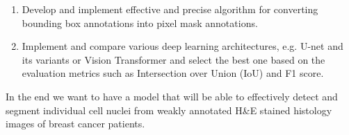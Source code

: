 \begin{enumerate}
    \item Develop and implement effective and precise algorithm for converting bounding box annotations into pixel mask annotations.
    \item Implement and compare various deep learning architectures, e.g. U-net and its variants or Vision Transformer and select the best one based on the evaluation metrics such as Intersection over Union (IoU) and F1 score.
\end{enumerate}

In the end we want to have a model that will be able to effectively detect and segment individual cell nuclei from weakly annotated H\&E stained histology images of breast cancer patients.


